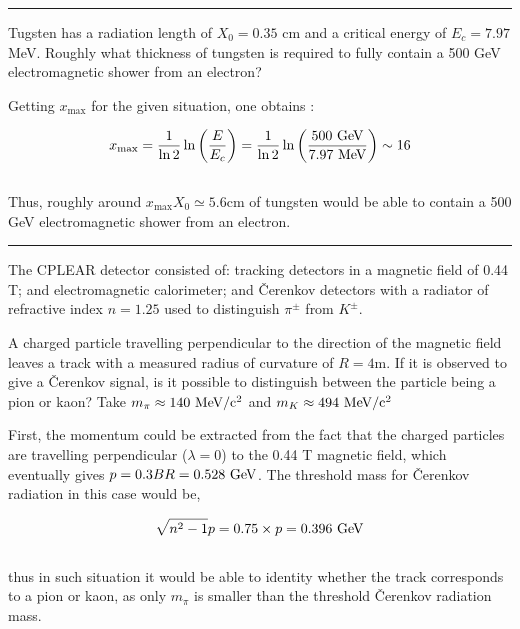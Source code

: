 \noindent\rule{7in}{1.5pt}


\begin{problem}{1.8}
Tugsten has a radiation length of $X_0=0.35$ cm and a critical energy of $E_c = 7.97$ MeV. Roughly what thickness of tungsten is required to fully contain a 500 GeV electromagnetic shower from an electron?
\end{problem}
\begin{solution}
Getting $x_\text{max}$ for the given situation, one obtains :

\begin{align*}
    x_{\text{max}} = \frac{1}{\ln 2}\ln\left( \frac{E}{E_c}\right) = \frac{1}{\ln 2}\ln\left( \frac{500 \text{ GeV}}{7.97 \text{ MeV}}\right) \sim 16
\end{align*}\\
Thus, roughly around $x_\text{max}X_0 \simeq 5.6 \unit{\centi\metre}$ of tungsten would be able to contain a 500 GeV electromagnetic shower from an electron.\\
\end{solution} 
\noindent\rule{7in}{1.5pt}


\begin{problem}{1.9}
The CPLEAR detector consisted of: tracking detectors in a magnetic field of 0.44 T; and electromagnetic calorimeter;
and Čerenkov detectors with a radiator of refractive index $n=1.25$ used to distinguish $\pi^\pm$ from $K^\pm$.

A charged particle travelling perpendicular to the direction of the magnetic field leaves a track with a
measured radius of curvature of $R=4$m. If it is observed to give a Čerenkov signal, is it 
possible to distinguish between the particle being a pion or kaon? Take $m_\pi \approx 140 \text{ MeV} /\text{c}^2$ and $m_K \approx 494 \text{ MeV} /\text{c}^2$ 
\end{problem}
\begin{solution}
First, the momentum could be extracted from the fact that the charged particles are travelling perpendicular ($\lambda =0 $) to the 0.44 T magnetic field, 
which eventually gives $p=0.3BR=0.528\text{ GeV}$. The threshold mass for Čerenkov radiation in this case would be,

\begin{align*}
    \sqrt{n^2-1} p = 0.75 \times p = 0.396 \text{ GeV}
\end{align*}\\
thus in such situation it would be able to identity whether the track corresponds to a pion or kaon, as only $m_\pi$ is smaller than the threshold Čerenkov radiation mass.
\end{solution}

